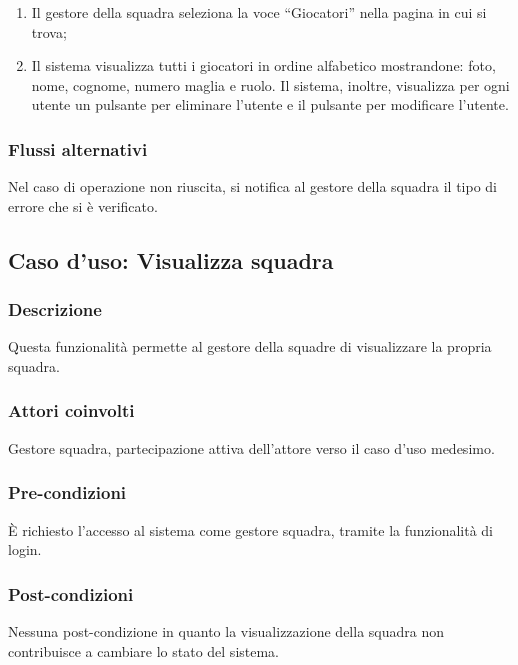 \begin{enumerate}
	
	\item
	Il gestore della squadra seleziona la voce ``Giocatori'' nella pagina in cui si trova;
	
	\item
	Il sistema visualizza tutti i giocatori in ordine alfabetico mostrandone: foto, nome, cognome, numero maglia e ruolo. Il sistema, inoltre, visualizza per ogni utente un pulsante per eliminare l'utente e il pulsante per modificare l'utente.
	
\end{enumerate}

\subsubsection*{Flussi alternativi}
Nel caso di operazione non riuscita, si notifica al gestore della squadra il tipo di errore che si è verificato.


%
%
\subsection{Caso d'uso: Visualizza squadra}
\label{uc-visualizza-squadra}

\subsubsection*{Descrizione}
Questa funzionalità permette al gestore della squadre di visualizzare la propria squadra.

\subsubsection*{Attori coinvolti}
Gestore squadra, partecipazione attiva dell'attore verso il caso d'uso medesimo.

\subsubsection*{Pre-condizioni}
È richiesto l'accesso al sistema come gestore squadra, tramite la funzionalità di login.

\subsubsection*{Post-condizioni}
Nessuna post-condizione in quanto la visualizzazione della squadra non contribuisce a cambiare lo stato del sistema.

